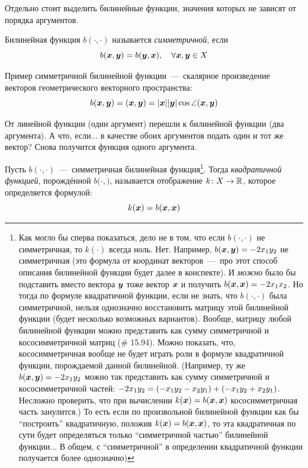 \documentclass[a4paper,12pt]{article}
\begin{document}
  Отдельно стоит выделить билинейные функции, значения которых не зависят от порядка аргументов.
  
  \begin{definition}
    Билинейная функция $b(\cdot, \cdot)$ называется \emph{симметричной}, если
    \[
      b(\boldsymbol x, \boldsymbol y) = b(\boldsymbol y, \boldsymbol x),\quad \forall \boldsymbol x, \boldsymbol y \in X
    \]
  \end{definition}
  
  \begin{example}
    Пример симметричной билинейной функции~---~скалярное произведение векторов геометрического векторного пространства:
    \begin{equation}\label{eq:bili-example}
      b(\boldsymbol x, \boldsymbol y) = (\boldsymbol x, \boldsymbol y) = |\boldsymbol x| |\boldsymbol y| \cos\angle(\boldsymbol x, \boldsymbol y)
    \end{equation}
  \end{example}
  
  От линейной функции (один аргумент) перешли к билинейной функции (два аргумента).
  А что, если...
  в качестве обоих аргументов подать один и тот же вектор?
  Снова получится функция одного аргумента.
  
  \begin{definition}
    Пусть $b(\cdot, \cdot)$~---~симметричная билинейная функция\footnote{
      Как могло бы сперва показаться, дело не в том, что если $b(\cdot, \cdot)$ не симметричная, то $k(\cdot)$ всегда ноль.
      Нет.
      Например, $b(\bds x, \bds y) \hm= -2 x_1 y_2$ не симметричная (это формула от координат векторов~---~про этот способ описания билинейной функции будет далее в конспекте).
      И \emph{можно} было бы подставить вместо вектора $\boldsymbol y$ тоже вектор $\boldsymbol x$ и получить $b(\bds x, \bds x) \hm= -2 x_1 x_2$.
      Но тогда по формуле квадратичной функции, если не знать, что $b(\cdot, \cdot)$ была симметричной, нельзя однозначно восстановить матрицу этой билинейной функции (будет несколько возможных вариантов).
      Вообще, матрицу любой билинейной функции можно представить как сумму симметричной и кососимметричной матриц (\# 15.94).
      Можно показать, что, кососимметричная вообще не будет играть роли в формуле квадратичной функции, порождаемой данной билинейной.
      (Например, ту же $b(\bds x, \bds y) \hm= -2 x_1 y_2$ можно так представить как сумму симметричной и кососимметричной частей: $-2 x_1 y_2 \hm= (-x_1 y_2 \hm- x_2 y_1) \hm+ (-x_1 y_2 \hm+ x_2 y_1)$.
      Несложно проверить, что при вычислении $k(\bds x) \hm= b(\bds x, \bds x)$ кососимметричная часть занулится.)
      То есть если по произвольной билинейной функции как бы ``построить'' квадратичную, положив $k(\bds x) \hm= b(\bds x, \bds x)$, то эта квадратичная по сути будет определяться только ``симметричной частью'' билинейной функции...
      В общем, с ``симметричной'' в определении квадратичной функции получается более однозначно)
    }.  %
    Тогда \emph{квадратичной функцией}, порождённой $b(\cdot, \dot)$, называется отображение $k\colon X \hm\to \RR$, которое определяется формулой:
    \[
      k(\boldsymbol x) = b(\boldsymbol x, \boldsymbol x)
    \]
  \end{definition}
  
\end{document}
